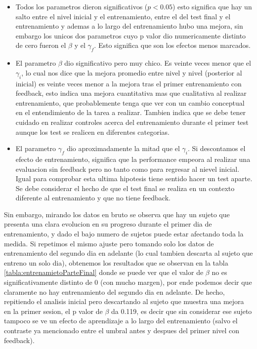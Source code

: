 \documentclass{article}
\begin{document}
\begin{itemize}
    \item Todos los parametros dieron significativos ($p<0.05$) esto significa que hay un salto entre el nivel inicial y el entrenamiento, entre el del test final y el entrenamiento y ademas a lo largo del entrenamiento hubo una mejora, sin embargo los unicos dos parametros cuyo p valor dio numericamente distinto de cero fueron el $\beta$ y el $\gamma_f$. Esto significa que son los efectos menos marcados.
    \item El parametro $\beta$ dio significativo pero muy chico. Es veinte veces menor que el $\gamma_i$, lo cual nos dice que la mejora promedio entre nivel y nivel (posterior al inicial) es veinte veces menor a la mejora tras el primer entrenamiento con feedback, esto indica una mejora cuantitativa mas que cualitativa al realizar entrenamiento, que probablemente tenga que ver con un cambio conceptual en el entendimiento de la tarea a realizar. Tambien indica que se debe tener cuidado en realizar controles acerca del entrenamiento durante el primer test aunque los test se realicen en diferentes categorias.
    \item El parametro $\gamma_f$ dio aproximadamente la mitad que el $\gamma_i$. Si descontamos el efecto de entrenamiento, significa que la performance empeora al realizar una evaluacion sin feedback pero no tanto como para regresar al nievel inicial. Igual para comprobar esta ultima hipotesis tiene sentido hacer un test aparte. Se debe considerar el hecho de que el test final se realiza en un contexto diferente al entrenamiento y que no tiene feedback. 
\end{itemize}

Sin embargo, mirando los datos en bruto se observa que hay un sujeto que presenta una clara evolucion en su progreso durante el primer dia de entrenamiento, y dado el bajo numero de sujetos puede estar afectando toda la medida. Si repetimos el mismo ajuste pero tomando solo los datos de entrenamiento del segundo dia en adelante (lo cual tambien descarta al sujeto que entreno un solo dia), obtenemos los resultados que se observan en la tabla \ref{tabla:entrenamietoParteFinal} donde se puede ver que el valor de $\beta$ no es significativamente distinto de 0 (con mucho margen), por ende podemos decir que claramente no hay entrenamiento del segundo dia en adelante. De hecho, repitiendo el analisis inicial pero descartando al sujeto que muestra una mejora en la primer sesion, el p valor de $\beta$ da 0.119, es decir que sin considerar ese sujeto tampoco se ve un efecto de aprendizaje a lo largo del entrenamiento (salvo el contraste ya mencionado entre el umbral antes y despues del primer nivel con feedback). 
\end{document}
